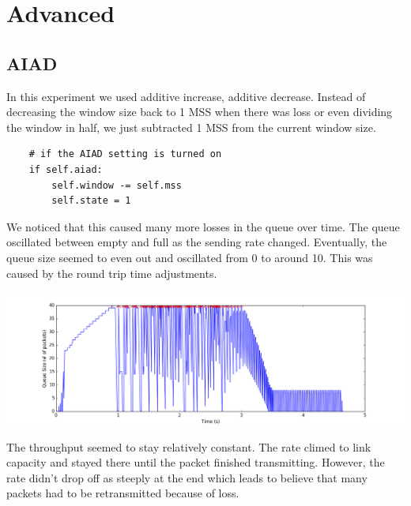 \documentclass[11pt]{article}
\begin{document}
\vspace{5mm}

\section{Advanced}

\subsection{AIAD}

In this experiment we used additive increase, additive decrease. Instead of decreasing the window size back to 1 MSS when there was loss or even dividing the window in half, we just subtracted 1 MSS from the current window size.

\vspace{5mm}

\begin{lstlisting}
    # if the AIAD setting is turned on
    if self.aiad:
        self.window -= self.mss
        self.state = 1
\end{lstlisting}

\vspace{5mm}

We noticed that this caused many more losses in the queue over time. The queue oscillated between empty and full as the sending rate changed. Eventually, the queue size seemed to even out and oscillated from 0 to around 10. This was caused by the round trip time adjustments.

\vspace{5mm}

\includegraphics[width=17cm]{charts/advanced/aiad/queueSize.png}

\vspace{5mm}

The throughput seemed to stay relatively constant. The rate climed to link capacity and stayed there until the packet finished transmitting. However, the rate didn't drop off as steeply at the end which leads to believe that many packets had to be retransmitted because of loss.
\end{document}

